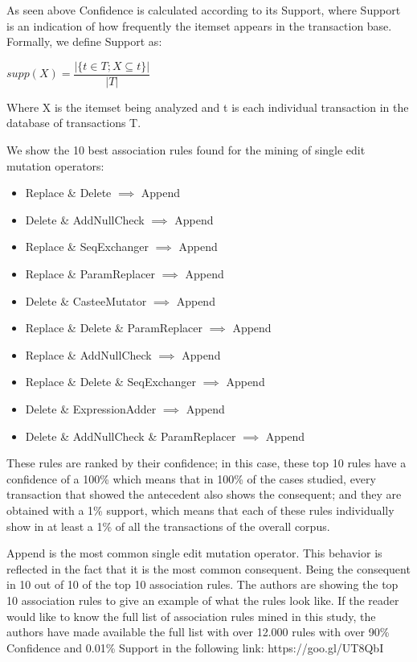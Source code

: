 \documentclass[conference]{IEEEtran}
\begin{document}
As seen above Confidence is calculated according to its Support, where Support is an indication of how frequently the itemset appears in the transaction base.
Formally, we define Support as:

\begin{center}
$supp(X) = \dfrac{|\{t \in T; X \subseteq t\}|}{|T|}$
\end{center}

Where X is the itemset being analyzed and t is each individual transaction in the database of transactions T. 

We show the 10 best association rules found for the mining of single edit mutation operators:

\begin{itemize}
\item Replace \& Delete $\implies$ Append
\item Delete \& AddNullCheck $\implies$ Append
\item Replace \& SeqExchanger $\implies$ Append
\item Replace \& ParamReplacer $\implies$ Append
\item Delete \& CasteeMutator $\implies$ Append
\item Replace \& Delete \& ParamReplacer $\implies$ Append
\item Replace \& AddNullCheck $\implies$ Append
\item Replace \& Delete \& SeqExchanger $\implies$ Append
\item Delete \& ExpressionAdder $\implies$ Append
\item Delete \& AddNullCheck \& ParamReplacer $\implies$ Append
\end{itemize}

These rules are ranked by their confidence; in this case, these top 10 rules have a confidence of a 100\% which means that in 100\% of the cases studied, every transaction that showed the antecedent also shows the consequent; and they are obtained with a 1\% support, which means that each of these rules individually show in at least a 1\% of all the transactions of the overall corpus.

Append is the most common single edit mutation operator. This behavior is reflected in the fact that it is the most common consequent. Being the consequent in 10 out of 10 of the top 10 association rules. The authors are showing the top 10 association rules to give an example of what the rules look like. If the reader would like to know the full list of association rules mined in this study, the authors have made available the full list with over 12.000 rules with over 90\% Confidence and 0.01\% Support in the following link: https://goo.gl/UT8QbI
\end{document}
